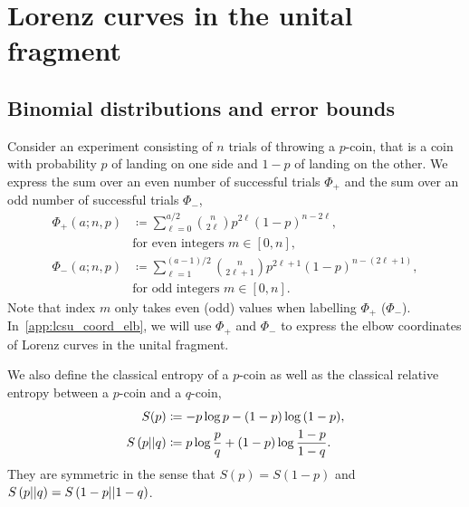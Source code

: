 
\section{Lorenz curves in the unital fragment}
\label{app:lcsu_technical}

\subsection{Binomial distributions and error bounds}\label{app:phi}
Consider an experiment consisting of $n$ trials of throwing a $p$-coin, that is a coin with probability $p$ of landing on one side and $1-p$ of landing on the other.
We express the sum over an even number of successful trials $\Phi_+$ and the sum over an odd number of successful trials $\Phi_-$,
\begin{align}	
	\Phi_+(a; n, p) &\coloneqq \sum\limits_{\ell=0}^{a/2} \binom{n}{2\ell} p^{2\ell} (1-p)^{n-2\ell}, \nonumber\\ 
	&\text{for even integers } m\in[0,n], \label{eq:fp_app} \\
	\Phi_-(a; n, p) &\coloneqq \sum\limits_{\ell=1}^{(a-1)/2} \binom{n}{2\ell+1} p^{2\ell+1} (1-p)^{n-(2\ell+1)}, \nonumber\\ 
	&\text{for odd integers }m\in[0,n]. \label{eq:fn_app}
\end{align}
Note that index $m$ only takes even (odd) values when labelling $\Phi_+$ ($\Phi_-$).
In~\cref{app:lcsu_coord_elb}, we will use $\Phi_+$ and $\Phi_-$ to express the elbow coordinates of Lorenz curves in the unital fragment.

We also define the classical entropy of a $p$-coin as well as the classical relative entropy between a $p$-coin and a $q$-coin,
\begin{align}
	S(p) &\coloneqq -p\log{p} -(1-p)\log{(1-p)}, \label{eq:ent}\\
	S\left( p \middle\vert\middle\vert q \right) &\coloneqq p \log{\frac{p}{q}} + (1-p) \log{\frac{1-p}{1-q}}. \label{eq:ent_rel}
\end{align}
They are symmetric in the sense that $S(p) = S(1-p)$ and $S\left( p \middle\vert\middle\vert q \right) = S\left( 1-p \middle\vert\middle\vert 1-q \right)$.

